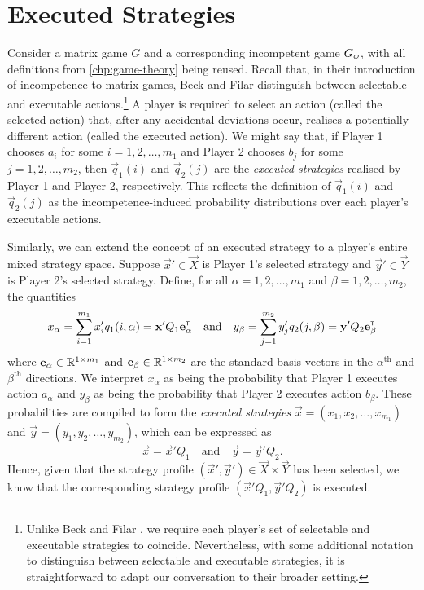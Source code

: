 \section{Executed Strategies}  \label{sec:executed-strategies}
    Consider a matrix game $G$ and a corresponding incompetent game $G_\ms{Q}$, with all definitions from \autoref{chp:game-theory} being reused.
    Recall that, in their introduction of incompetence to matrix games, Beck and Filar \parencite{Beck2007} distinguish between selectable and executable actions.\footnote{
        Unlike Beck and Filar \parencite{Beck2007}, we require each player's set of selectable and executable strategies to coincide.
        Nevertheless, with some additional notation to distinguish between selectable and executable strategies, it is straightforward to adapt our conversation to their broader setting.
    }
    A player is required to select an action (called the selected action) that, after any accidental deviations occur, realises a potentially different action (called the executed action).
    We might say that, if Player 1 chooses $a_i$ for some $i = 1, 2, \ldots, m_1$ and Player 2 chooses $b_j$ for some $j = 1, 2, \ldots, m_2$, then $\vec{q}_1(i)$ and $\vec{q}_2(j)$ are the \emph{executed strategies} realised by Player 1 and Player 2, respectively.
    This reflects the definition of $\vec{q}_1(i)$ and $\vec{q}_2(j)$ as the incompetence-induced probability distributions over each player's executable actions.

    Similarly, we can extend the concept of an executed strategy to a player's entire mixed strategy space.
    Suppose $\vec{x}' \in \vec{X}$ is Player 1's selected strategy and $\vec{y}' \in \vec{Y}$ is Player 2's selected strategy.
    Define, for all $\alpha = 1, 2, \ldots, m_1$ and $\beta = 1, 2, \ldots, m_2$, the quantities
    \begin{equation}  \label{eq:executed-action-probability}
        x_\alpha
            = \sum_{i = 1}^{m_1} x'_i q_1(i, \alpha)
            = \mathbf{x}' Q_1 \mathbf{e}_\alpha^{\scriptscriptstyle \mathsf{T}}
        \quad\text{and}\quad
        y_\beta
            = \sum_{j = 1}^{m_2} y'_j q_2(j, \beta)
            = \mathbf{y}' Q_2 \mathbf{e}_\beta^{\scriptscriptstyle \mathsf{T}}
    \end{equation}
    where $\mathbf{e}_\alpha \in \mathbb{R}^{1 \times m_1}$ and $\mathbf{e}_\beta \in \mathbb{R}^{1 \times m_2}$ are the standard basis vectors in the $\alpha^{\text{th}}$ and $\beta^{\text{th}}$ directions.
    We interpret $x_\alpha$ as being the probability that Player 1 executes action $a_\alpha$ and $y_\beta$ as being the probability that Player 2 executes action $b_\beta$.
    These probabilities are compiled to form the \emph{executed strategies} $\vec{x} = (x_1, x_2, \ldots, x_{m_1})$ and $\vec{y} = (y_1, y_2, \ldots, y_{m_2})$, which can be expressed as
    \begin{equation}  \label{eq:executed-strategies}
        \vec{x}
            = \vec{x}' Q_1
        \quad\text{and}\quad
        \vec{y}
            = \vec{y}' Q_2.
    \end{equation}
    Hence, given that the strategy profile $(\vec{x}' , \vec{y}') \in \vec{X} \times \vec{Y}$ has been selected, we know that the corresponding strategy profile $(\vec{x}' Q_1, \vec{y}' Q_2)$ is executed.

